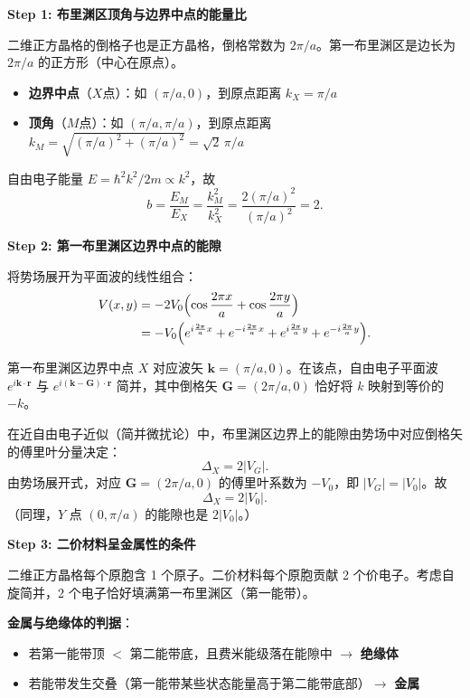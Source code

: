 \begin{derivationbox}[标准解题过程]
\textbf{Step 1: 布里渊区顶角与边界中点的能量比}

二维正方晶格的倒格子也是正方晶格，倒格常数为 $2\pi/a$。第一布里渊区是边长为 $2\pi/a$ 的正方形（中心在原点）。

\begin{itemize}
    \item \textbf{边界中点}（$X$点）：如 $(\pi/a,0)$，到原点距离 $k_X = \pi/a$
    \item \textbf{顶角}（$M$点）：如 $(\pi/a,\pi/a)$，到原点距离 $k_M = \sqrt{(\pi/a)^2+(\pi/a)^2} = \sqrt{2}\,\pi/a$
\end{itemize}

自由电子能量 $E = \hbar^2k^2/2m \propto k^2$，故
\begin{equation}
b = \frac{E_M}{E_X} = \frac{k_M^2}{k_X^2} = \frac{2(\pi/a)^2}{(\pi/a)^2} = \boxed{2.}
\end{equation}

\textbf{Step 2: 第一布里渊区边界中点的能隙}

将势场展开为平面波的线性组合：
\begin{align}
V(x,y) &= -2V_0\Bigl(\cos\frac{2\pi x}{a}+\cos\frac{2\pi y}{a}\Bigr) \notag\\
&= -V_0\Bigl(e^{i\frac{2\pi}{a}x}+e^{-i\frac{2\pi}{a}x}+e^{i\frac{2\pi}{a}y}+e^{-i\frac{2\pi}{a}y}\Bigr).
\end{align}

第一布里渊区边界中点 $X$ 对应波矢 $\bm{k}=(\pi/a,0)$。在该点，自由电子平面波 $e^{i\bm{k}\cdot\bm{r}}$ 与 $e^{i(\bm{k}-\bm{G})\cdot\bm{r}}$ 简并，其中倒格矢 $\bm{G}=(2\pi/a,0)$ 恰好将 $k$ 映射到等价的 $-k$。

在近自由电子近似（简并微扰论）中，布里渊区边界上的能隙由势场中对应倒格矢的傅里叶分量决定：
\begin{equation}
\Delta_X = 2|V_G|.
\end{equation}
由势场展开式，对应 $\bm{G}=(2\pi/a,0)$ 的傅里叶系数为 $-V_0$，即 $|V_G|=|V_0|$。故
\begin{equation}
\boxed{\Delta_X = 2|V_0|.}
\end{equation}
（同理，$Y$ 点 $(0,\pi/a)$ 的能隙也是 $2|V_0|$。）

\textbf{Step 3: 二价材料呈金属性的条件}

二维正方晶格每个原胞含 1 个原子。二价材料每个原胞贡献 2 个价电子。考虑自旋简并，2 个电子恰好填满第一布里渊区（第一能带）。

\textbf{金属与绝缘体的判据}：
\begin{itemize}
    \item 若第一能带顶 $<$ 第二能带底，且费米能级落在能隙中 $\rightarrow$ \textbf{绝缘体}
    \item 若能带发生交叠（第一能带某些状态能量高于第二能带底部）$\rightarrow$ \textbf{金属}
\end{itemize}


\end{derivationbox}
